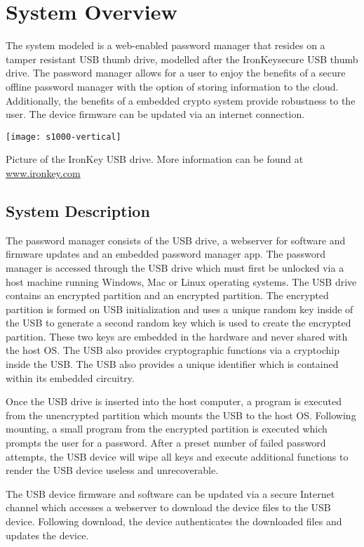 \chapter{System Overview}
\label{ch:System Overview}
The system modeled is a web-enabled password manager that resides on a
tamper resistant USB thumb drive, modelled after the
IronKey\texttrademark secure USB thumb drive. The password manager
allows for a user to enjoy the benefits of a secure offline password
manager with the option of storing information to the cloud.
Additionally, the benefits of a embedded crypto system provide
robustness to the user.  The device firmware can be updated via an
internet connection.

\begin{marginfigure}%
\centering
  \texttt{[image: s1000-vertical]}
  \caption{Picture of the IronKey USB drive.  More information can be
found at \url{www.ironkey.com}}
  \label{fig:ik}
\end{marginfigure}



\section{System Description}
\label{sec:sysdesc}

The password manager consists of the USB drive, a webserver for software and firmware updates and an embedded password manager app.  The password manager is accessed through the USB drive which must first be unlocked via a host machine running Windows, Mac or Linux operating
systems. The USB drive contains an encrypted partition and an
encrypted partition.  The encrypted partition is formed on USB
initialization and uses a unique random key inside of the USB to
generate a second random key which is used to create the encrypted
partition. These two keys are embedded in the hardware and never
shared with the host OS.  The USB also provides cryptographic functions via a cryptochip inside the USB.  The USB also provides a unique identifier which is contained within its embedded circuitry.
\par Once the USB drive is inserted into the host computer, a program
is executed from the unencrypted partition which mounts the USB to the
host OS.  Following mounting, a small program from the encrypted
partition is executed which prompts the user for a password. After a
preset number of failed password attempts, the USB device will wipe
all keys and execute additional functions to render the USB device
useless and unrecoverable.
\par The USB device firmware and software can be updated via a secure Internet channel which accesses a webserver to download the device files to the USB device.  Following download, the device authenticates the downloaded files and updates the device.

